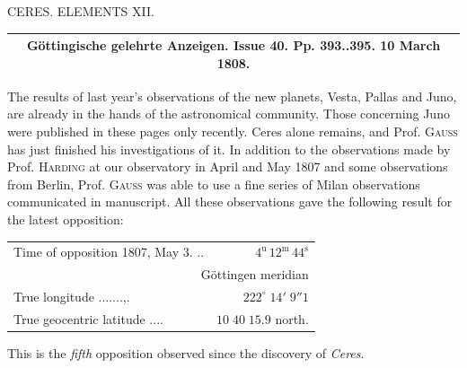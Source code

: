 \clearpage
{}
\hypertarget{native-304-lower}{}
\begin{center}CERES. ELEMENTS XII.
\end{center}

\begin{center}
\fontsize{10}{12}\selectfont\begin{tabular}{c}
\hline
Göttingische gelehrte Anzeigen. Issue 40. Pp. 393..395. 10 March 1808. \\
\hline
\end{tabular}
\end{center}

The results of last year’s observations of the new planets, Vesta, Pallas and Juno, are already in the hands of the astronomical community. Those concerning Juno were published in these pages only recently. Ceres alone remains, and Prof. \textsc{Gauss} has just finished his investigations of it. In addition to the observations made by Prof. \textsc{Harding} at our observatory in April and May 1807 and some observations from Berlin, Prof. \textsc{Gauss} was able to use a fine series of Milan observations communicated in manuscript. All these observations gave the following result for the latest opposition:


\begin{center}\fontsize{10}{12}\selectfont\setlength{\tabcolsep}{3pt}\renewcommand{\arraystretch}{1.15}\begin{tabular}{lr}
Time of opposition 1807, May 3. .\;.\; & $4^{\text{u}}\,12^{\text{m}}\,44^{\text{s}}$\\
\multicolumn{2}{r}{Göttingen meridian}\\
True longitude .\;.\;.\;.\;.\;.\;.\;,\;.\; & $222^\circ\;14'\;9''1$\\
True geocentric latitude .\;.\;.\;.\; & $10\;40\;15.9$ north.\\
\end{tabular}\end{center}

\noindent This is the \emph{fifth} opposition observed since the discovery of \emph{Ceres}.

